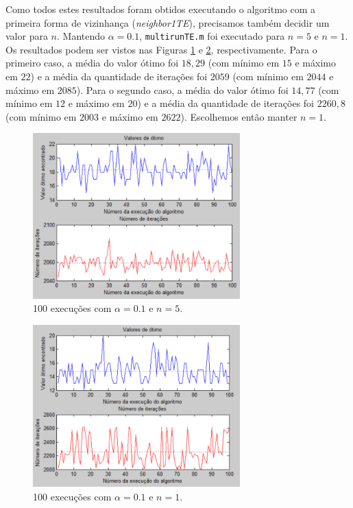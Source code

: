 \documentclass[conference]{IEEEtran}
\begin{document}
Como todos estes resultados foram obtidos executando o algoritmo com a primeira forma de vizinhança (\textit{neighbor1TE}), precisamos também decidir um valor para $n$. Mantendo $\alpha = 0.1$, \texttt{multirunTE.m} foi executado para $n = 5$ e $n = 1$. Os resultados podem ser vistos nas Figuras \ref{fig:mult-result-4} e \ref{fig:mult-result-5}, respectivamente. Para o primeiro caso, a média do valor ótimo foi $18,29$ (com mínimo em $15$ e máximo em $22$) e a média da quantidade de iterações foi $2059$ (com mínimo em $2044$ e máximo em $2085$). Para o segundo caso, a média do valor ótimo foi $14,77$ (com mínimo em $12$ e máximo em $20$) e a média da quantidade de iterações foi $2260,8$ (com mínimo em $2003$ e máximo em $2622$). Escolhemos então manter $n = 1$.

	\begin{figure}[h]
		\centering
		\includegraphics[width=8cm]{img/mult-result-4.png}
		\caption{100 execuções com $\alpha = 0.1$ e $n = 5$.}
		\label{fig:mult-result-4}
	\end{figure}
	
	\begin{figure}[h]
		\centering
		\includegraphics[width=8cm]{img/mult-result-5.png}
		\caption{100 execuções com $\alpha = 0.1$ e $n = 1$.}
		\label{fig:mult-result-5}
	\end{figure}
	
\end{document}
